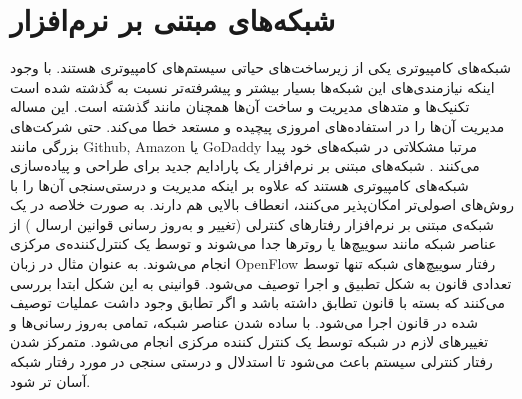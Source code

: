 \section{شبکه‌های مبتنی بر نرم‌افزار}
شبکه‌های کامپیوتری یکی از زیر‌ساخت‌های حیاتی سیستم‌های کامپیوتری هستند.
با وجود اینکه نیازمندی‌های این شبکه‌ها بسیار بیشتر و پیشرفته‌تر نسبت به گذشته شده است تکنیک‌ها و متد‌های مدیریت و ساخت آن‌ها همچنان مانند گذشته است. 
این مساله مدیریت آن‌ها را در استفاده‌های امروزی پیچیده و مستعد خطا می‌کند. 
حتی شرکت‌های بزرگی مانند
Github, Amazon
یا
GoDaddy
مرتبا مشکلاتی در شبکه‌های خود پیدا می‌کنند
\cite{foerster2018survey}
.
شبکه‌های مبتنی بر نرم‌افزار
یک پارادایم جدید برای طراحی و پیاده‌سازی شبکه‌های کامپیوتری هستند که علاوه بر اینکه مدیریت و درستی‌سنجی آن‌ها را با روش‌های اصولی‌تر امکان‌پذیر می‌کنند، انعطاف بالایی هم دارند.
به صورت خلاصه در یک شبکه‌ی مبتنی بر نرم‌افزار رفتار‌های کنترلی 
(تغییر و به‌روز رسانی قوانین ارسال
)
از عناصر شبکه مانند سوییچ‌ها یا روترها جدا می‌شوند و توسط یک کنترل‌کننده‌ی مرکزی انجام می‌شوند.
به عنوان مثال در زبان 
OpenFlow \cite{mckeown2008openflow}
رفتار سوییچ‌های شبکه تنها توسط تعدادی قانون به شکل 
تطبیق
و اجرا
توصیف می‌شود.
قوانینی به این شکل ابتدا بررسی می‌کنند که بسته با قانون تطابق داشته باشد و اگر تطابق وجود داشت عملیات توصیف شده در قانون اجرا می‌شود.
با ساده شدن عناصر شبکه،‌ تمامی به‌روز رسانی‌ها و تغییر‌های لازم در شبکه توسط یک کنترل کننده مرکزی انجام می‌شود.
متمرکز شدن رفتار کنترلی سیستم باعث می‌شود تا استدلال و درستی سنجی در مورد رفتار شبکه آسان تر شود.